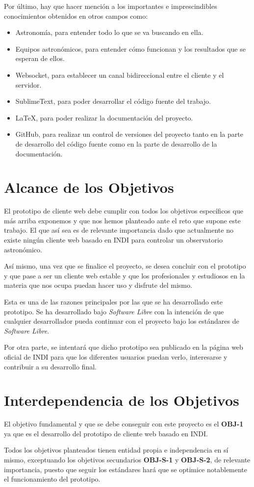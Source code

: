 Por último, hay que hacer mención a los importantes e imprescindibles conocimientos obtenidos en otros campos como:
\begin{itemize}
  \item Astronomía, para entender todo lo que se va buscando en ella.
  \item Equipos astronómicos, para entender cómo funcionan y los resultados que se esperan de ellos.
  \item Websocket, para establecer un canal bidireccional entre el cliente y el servidor.
  \item SublimeText, para poder desarrollar el código fuente del trabajo.
  \item LaTeX, para poder realizar la documentación del proyecto.
  \item GitHub, para realizar un control de versiones del proyecto tanto en la parte de desarrollo del código fuente como en la parte de desarrollo de la documentación.
\end{itemize}


\section{Alcance de los Objetivos}
El prototipo de cliente web debe cumplir con todos los objetivos específicos que más arriba exponemos y que nos hemos planteado ante el reto que supone este trabajo. El que así sea es de relevante importancia dado que actualmente no existe ningún cliente web basado en INDI para controlar un observatorio astronómico.

Así mismo, una vez que se finalice el proyecto, se desea concluir con el prototipo y que pase a ser un cliente web estable y que los profesionales y estudiosos en la materia que nos ocupa puedan hacer uso y disfrute del mismo.

Esta es una de las razones principales por las que se ha desarrollado este prototipo. Se ha desarrollado bajo \textit{Software Libre} con la intención de que cualquier desarrollador pueda continuar con el proyecto bajo los estándares de \textit{Software Libre}.

Por otra parte, se intentará que dicho prototipo sea publicado en la página web oficial de INDI para que los diferentes usuarios puedan verlo, interesarse y contribuir a su desarrollo final.


\section{Interdependencia de los Objetivos}
El objetivo fundamental y que se debe conseguir con este proyecto es el \textbf{OBJ-1} ya que es el desarrollo del prototipo de cliente web basado en INDI.

Todos los objetivos planteados tienen entidad propia e independencia en sí mismo, exceptuando los objetivos secundarios \textbf{OBJ-S-1} y \textbf{OBJ-S-2}, de relevante importancia, puesto que seguir los estándares hará que se optimice notablemente el funcionamiento del prototipo.
